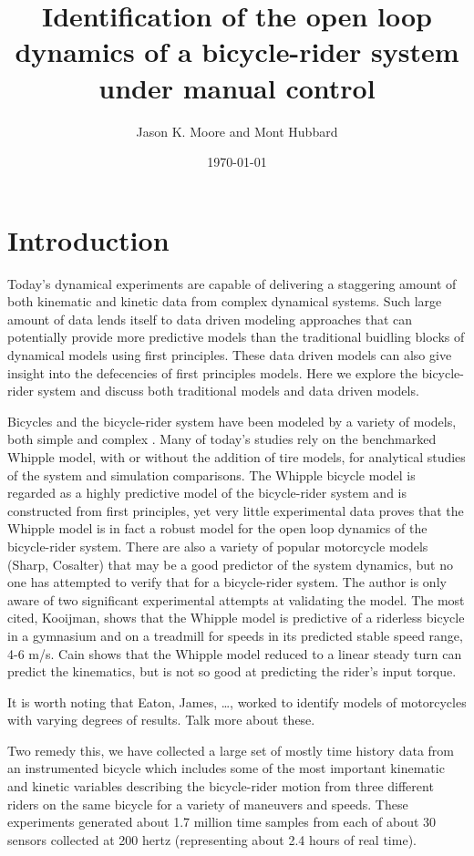 \documentclass[a4paper]{article}
\title{Identification of the open loop dynamics of a bicycle-rider system
under manual control}
\author{Jason K. Moore and Mont Hubbard}
\date{\today}
\begin{document}
\maketitle

\section{Introduction}

Today's dynamical experiments are capable of delivering a staggering amount of both kinematic and
kinetic data from complex dynamical systems. Such large amount of data lends
itself to data driven modeling approaches that can potentially provide more
predictive models than the traditional buidling blocks of dynamical models using first principles.
These data driven models can also give insight into the defecencies of first
principles models. Here we explore the bicycle-rider system and discuss both
traditional models and data driven models.

Bicycles and the bicycle-rider system have been modeled by a variety of models,
both simple \cite{Timoshenko1948} and complex \cite{Sharp1971}. Many of
today's studies rely on the benchmarked Whipple model, with or without the
addition of tire models, for analytical studies of the system and simulation
comparisons. The Whipple bicycle model is regarded as a highly predictive model
of the bicycle-rider system and is constructed from first principles, yet very
little experimental data proves that the Whipple model is in fact a robust
model for the open loop dynamics of the bicycle-rider system. There are also a
variety of popular motorcycle models (Sharp, Cosalter) that may be a good
predictor of the system dynamics, but no one has attempted to verify that for a
bicycle-rider system. The author is only aware of two significant experimental
attempts at validating the model. The most cited, Kooijman, shows that the
Whipple model is predictive of a riderless bicycle in a gymnasium and on
a treadmill for speeds in its predicted stable speed range, 4-6 m/s. Cain shows
that the Whipple model reduced to a linear steady turn can predict the
kinematics, but is not so good at predicting the rider's input torque.

It is worth noting that Eaton, James, \ldots, worked to identify models of
motorcycles with varying degrees of results. Talk more about these.

Two remedy this, we have collected a large set of mostly time history data from
an instrumented bicycle which includes some of the most important kinematic and
kinetic variables describing the bicycle-rider motion from three different
riders on the same bicycle for a variety of maneuvers and speeds. These
experiments generated about 1.7 million time samples from each of about 30
sensors collected at 200 hertz (representing about 2.4 hours of real time).
\end{document}
